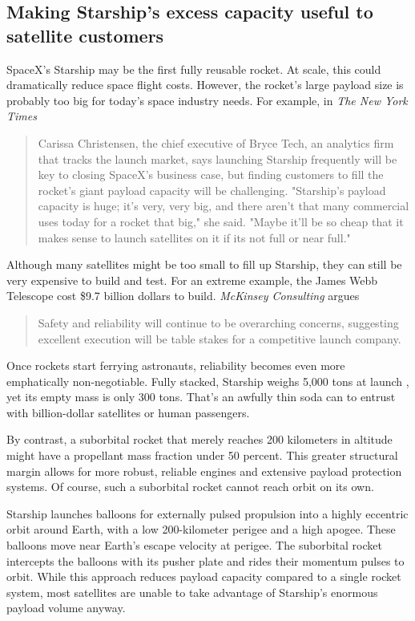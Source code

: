 \documentclass{article}
\begin{document}
\subsection{Making Starship's excess capacity useful to satellite customers}
SpaceX's Starship may be the first fully reusable rocket. At scale, this could dramatically reduce space flight costs.   However, the rocket's large payload size is probably too big for today's space industry needs. For example, in \textit{The New York Times}
\begin{quote}
Carissa Christensen, the chief executive of Bryce Tech, an analytics firm that tracks the launch market, says launching Starship frequently will be key to closing SpaceX’s business case, but finding customers to fill the rocket’s giant payload capacity will be challenging. 
"Starship's payload capacity is huge; it's very, very big, and there aren't that many commercial uses today for a rocket that big," she said.  "Maybe it'll be so cheap that it makes sense to launch satellites on it if its not full or near full."  \cite{nyt_starship_size}
\end{quote}
Although many satellites might be too small to fill up Starship, they can still be very expensive to build and test. For an extreme example, the James Webb Telescope \cite{james_webb_space_telescope} cost \$9.7 billion dollars \cite{jwst_cost} to build. \textit{McKinsey Consulting} argues 
\begin{quote}
Safety and reliability will continue to be overarching concerns, suggesting excellent execution will be table stakes for a competitive launch company. \cite{mckinsey_reliability}
\end{quote}
Once rockets start ferrying astronauts, reliability becomes even more emphatically non-negotiable. Fully stacked, Starship weighs 5,000 tons at launch \cite{starship}, yet its empty mass is only 300 tons. That’s an awfully thin soda can to entrust with billion-dollar satellites or human passengers.

By contrast, a suborbital rocket that merely reaches 200 kilometers in altitude might have a propellant mass fraction under 50 percent. This greater structural margin allows for more robust, reliable engines and extensive payload protection systems. Of course, such a suborbital rocket cannot reach orbit on its own.

Starship launches balloons for externally pulsed propulsion into a highly eccentric orbit around Earth, with a low 200-kilometer perigee and a high apogee. These balloons move near Earth’s escape velocity at perigee. The suborbital rocket intercepts the balloons with its pusher plate and rides their momentum pulses to orbit. While this approach reduces payload capacity compared to a single rocket system, most satellites are unable to take advantage of Starship’s enormous payload volume anyway.
\end{document}
